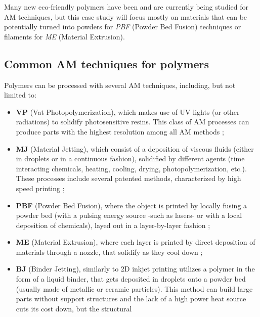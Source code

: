 \documentclass{article}
\begin{document}
    Many new eco-friendly polymers have been and are currently being studied for AM techniques, but this case study will focus mostly on materials that can be potentially turned 
    into powders for \textit{PBF} (Powder Bed Fusion) techniques or filaments for \textit{ME} (Material Extrusion). 
    
    \subsection{Common AM techniques for polymers\label{AM_techniques_summary}}
    
    Polymers can be processed with several AM techniques, including, but not limited to: 

    \begin{itemize}
        \item \textbf{VP} (Vat Photopolymerization), which makes use of UV lights (or other radiations) to solidify photosensitive resins. This class of AM processes can produce 
                        parts with the highest resolution among all AM methods \autocites*{Recent_progress_polymers_AM}{Kovalcik_PHA_Review};
        \item \textbf{MJ} (Material Jetting), which consist of a deposition of viscous fluids (either in droplets or in a continuous fashion), solidified by different agents 
                            (time interacting chemicals, heating, cooling, drying, photopolymerization, etc.). These processes include several patented methods, characterized by 
                            high speed printing \autocite*{Recent_progress_polymers_AM};
        \item \textbf{PBF} (Powder Bed Fusion), where the object is printed by locally fusing a powder bed (with a pulsing energy source -such as lasers- or with a local deposition of chemicals),
                            layed out in a layer-by-layer fashion \autocites*{Recent_progress_polymers_AM}{Kovalcik_PHA_Review};
        \item \textbf{ME} (Material Extrusion), where each layer is printed by direct deposition of materials through a nozzle, that solidify as they cool down \autocites*{Recent_progress_polymers_AM}{Kovalcik_PHA_Review};
        \item \textbf{BJ} (Binder Jetting), similarly to 2D inkjet printing utilizes a
                        polymer in the form of a liquid binder, that gets deposited in droplets onto a powder bed (usually made of metallic or ceramic particles). This 
                        method can build large parts without support structures and the lack of a high power heat source cuts its cost down, but the structural 

\end{itemize}
\end{document}
